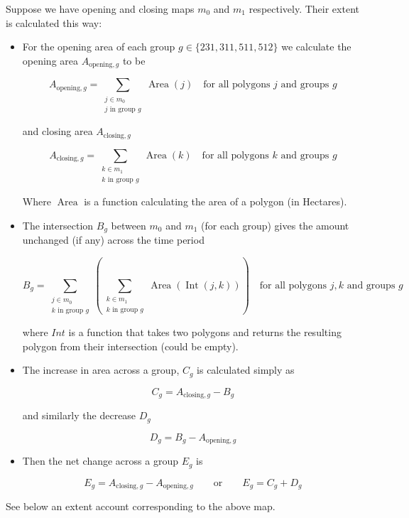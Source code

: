 \documentclass{article}
\DeclareMathOperator{\Area}{Area}
\DeclareMathOperator{\Int}{Int}
\begin{document}
Suppose we have opening and closing maps $m_0$ and $m_1$ respectively. Their extent is calculated this way:

\begin{itemize}
  \item For the opening area of each group $g \in \{231, 311, 511, 512\}$ we calculate the opening area $A_{\text{opening},g}$ to be

  $$ A_{\text{opening},g}= \sum\limits_{\substack{j \in m_0\\j\text{ in group }g}} \Area(j)\quad\text{for all polygons } j \text{ and groups }g$$

  and closing area $A_{\text{closing},g}$
  
  $$ A_{\text{closing},g}= \sum\limits_{\substack{k \in m_1\\k\text{ in group }g}} \Area(k)\quad\text{for all polygons } k \text{ and groups }g$$

  Where $\Area$ is a function calculating the area of a polygon (in Hectares).

  \item The intersection $B_g$ between $m_0$ and $m_1$ (for each group) gives the amount unchanged (if any) across the time period
  
  $$B_g=\sum\limits_{\substack{j \in m_0\\k\text{ in group }g}}\left(
        \sum\limits_{\substack{k \in m_1\\k\text{ in group }g}} \Area(\Int(j,k)) \right)\quad\text{for all polygons } j,k \text{ and groups }g$$

  where $Int$ is a function that takes two polygons and returns the resulting polygon from their intersection (could be empty).

  \item The increase in area across a group, $C_g$  is calculated simply as 
  
  $$C_g=A_{\text{closing},g} - B_g$$

  and similarly the decrease $D_g$

  $$D_g=B_g - A_{\text{opening},g}$$

  \item Then the net change across a group $E_g$ is
  
  $$E_g = A_{\text{closing},g}-A_{\text{opening},g} \qquad \text{or} \qquad E_g=C_g+D_g$$
\end{itemize}

See below an extent account corresponding to the above map.
\end{document}
